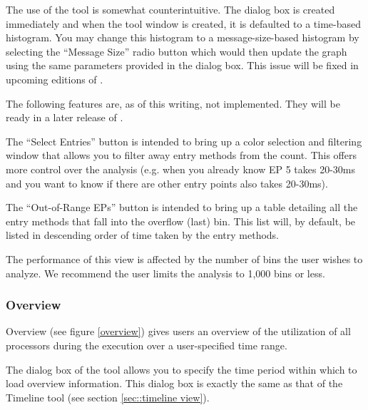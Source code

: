 \documentclass[10pt]{article}
\begin{document}
The use of the tool is somewhat counterintuitive. The dialog box is
created immediately and when the tool window is created, it is
defaulted to a time-based histogram. You may change this histogram to
a message-size-based histogram by selecting the ``Message Size'' radio
button which would then update the graph using the same parameters
provided in the dialog box. This issue will be fixed in upcoming
editions of \projections{}.

The following features are, as of this writing, not implemented. They
will be ready in a later release of \projections{}.

The ``Select Entries'' button is intended to bring up a color
selection and filtering window that allows you to filter away entry
methods from the count. This offers more control over the analysis
(e.g. when you already know EP 5 takes 20-30ms and you want to know if
there are other entry points also takes 20-30ms).

The ``Out-of-Range EPs'' button is intended to bring up a table
detailing all the entry methods that fall into the overflow (last)
bin. This list will, by default, be listed in descending order of time
taken by the entry methods.

The performance of this view is affected by the number of bins the
user wishes to analyze. We recommend the user limits the analysis to
1,000 bins or less.

\subsubsection{Overview}

Overview (see figure \ref{overview}) gives users an overview of the
utilization of all processors during the execution over a
user-specified time range.

The dialog box of the tool allows you to specify the time period
within which to load overview information. This dialog box is exactly
the same as that of the Timeline tool (see section \ref{sec::timeline
view}).
\end{document}
